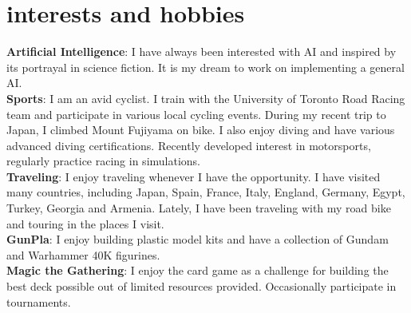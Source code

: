 \documentclass[]{cv-roald}
\begin{document}
\section*{interests and hobbies}
\textbf{Artificial Intelligence}: I have always been interested with AI and inspired by its portrayal in science fiction. It is my dream to work on implementing a general AI. \\
\textbf{Sports}: I am an avid cyclist. I train with the University of Toronto Road Racing team and participate in various local cycling events. During my recent trip to Japan, I climbed Mount Fujiyama on bike.
I also enjoy diving and have various advanced diving certifications. Recently developed interest in motorsports, regularly practice racing in simulations.\\
\textbf{Traveling}: I enjoy traveling whenever I have the opportunity. I have visited many countries, including Japan, Spain, France, Italy, England, Germany, Egypt, Turkey, Georgia and Armenia. Lately, I have been traveling with my road bike and touring in the places I visit.\\
\textbf{GunPla}: I enjoy building plastic model kits and have a collection of Gundam and Warhammer 40K figurines.\\
\textbf{Magic the Gathering}: I enjoy the card game as a challenge for building the best deck possible out of limited resources provided. Occasionally participate in tournaments.\\
\end{document}
